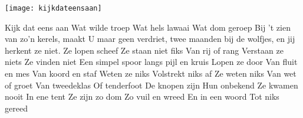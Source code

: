 \begin{intersong}
	\begin{center}
		\texttt{[image: kijkdateensaan]}
	\end{center}
\end{intersong}
\beginverse*
Kijk dat eens aan 
Wat wilde troep 
Wat hels lawaai 
Wat dom geroep
\endverse
\beginchorus
Bij 't zien van zo’n kerels,
maakt U maar geen verdriet,
twee maanden bij de wolfjes,
en jij herkent ze niet.
\endchorus
\beginverse*
Ze lopen scheef 
Ze staan niet fiks 
Van rij of rang 
Verstaan ze niets 
\endverse
\beginverse*
Ze vinden niet 
Een simpel spoor 
langs pijl en kruis 
Lopen ze door 
\endverse
\beginverse*
Van fluit en mes 
Van koord en staf 
Weten ze niks 
Volstrekt niks af 
\endverse
\beginverse*
Ze weten niks 
Van wet of groet 
Van tweedeklas 
Of tenderfoot 
\endverse
\beginverse*
De knopen zijn 
Hun onbekend 
Ze kwamen nooit 
In ene tent 
\endverse
\beginverse*
Ze zijn zo dom 
Zo vuil en wreed 
En in een woord 
Tot niks gereed 
\endverse
\endsong